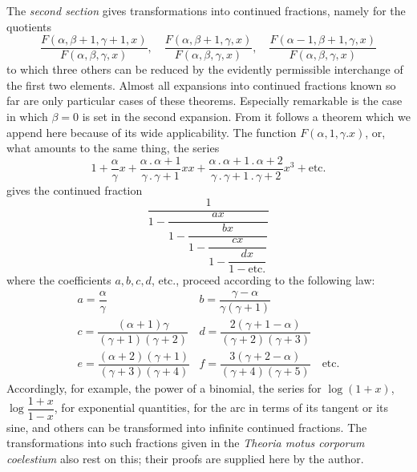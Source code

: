 The \textit{second section} gives transformations into continued fractions, namely for the quotients
\[
\frac{F(\alpha,\beta+1,\gamma+1,x)}{F(\alpha,\beta,\gamma,x)},\quad
\frac{F(\alpha,\beta+1,\gamma,x)}{F(\alpha,\beta,\gamma,x)},\quad
\frac{F(\alpha-1,\beta+1,\gamma,x)}{F(\alpha,\beta,\gamma,x)}
\]
to which three others can be reduced by the evidently permissible interchange of the first two elements. Almost all expansions into continued fractions known so far are only particular cases of these theorems.
Especially remarkable is the case in which $\beta=0$ is set in the second expansion. From it follows a theorem which we append here because of its wide applicability. The function $F(\alpha,1,\gamma.x)$, or, what amounts to the same thing, the series
\[
1+\frac{\alpha}{\gamma}x
+\frac{\alpha\,.\,\alpha+1}{\gamma\,.\,\gamma+1}xx
+\frac{\alpha\,.\,\alpha+1\,.\,\alpha+2}{\gamma\,.\,\gamma+1\,.\,\gamma+2}x^3+\mathrm{etc.}
\]
gives the continued fraction
\[
\dfrac{1}{\displaystyle 1-\dfrac{ax}{\displaystyle 1-\dfrac{bx}{\displaystyle 1-\dfrac{cx}{\displaystyle 1-\dfrac{dx}{1-\mathrm{etc.}}}}}}
\]
where the coefficients $a,b,c,d$, etc., proceed according to the following law:
\[
\begin{array}{ll}
a=\dfrac{\alpha}{\gamma}&b=\dfrac{\gamma-\alpha}{\gamma(\gamma+1)}\\[6pt]
c=\dfrac{(\alpha+1)\gamma}{(\gamma+1)(\gamma+2)}&d=\dfrac{2(\gamma+1-\alpha)}{(\gamma+2)(\gamma+3)}\\[6pt]
e=\dfrac{(\alpha+2)(\gamma+1)}{(\gamma+3)(\gamma+4)}&f=\dfrac{3(\gamma+2-\alpha)}{(\gamma+4)(\gamma+5)}\quad\mbox{etc.}
\end{array}
\]
Accordingly, for example, the power of a binomial, the series for $\log(1+x)$, $\log\dfrac{1+x}{1-x}$, for exponential quantities, for the arc in terms of its tangent or its sine, and others can be transformed into infinite continued fractions. The transformations into such fractions given in the \textit{Theoria motus corporum coelestium} also rest on this; their proofs are supplied here by the author.

